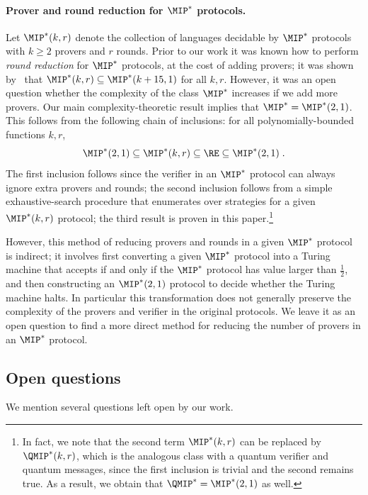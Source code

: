 \documentclass[11pt]{article}
\theoremstyle{definition}
\begin{document}
\paragraph{Prover and round reduction for $\MIP^*$ protocols.} Let $\MIP^*(k,r)$ denote the collection of languages decidable by $\MIP^*$ protocols with $k\geq 2$ provers and $r$ rounds. Prior to our work it was known how to perform \emph{round reduction} for $\MIP^*$ protocols, at the cost of adding provers; it was shown by~\cite{ji2017compression,fitzsimons2018quantum} that $\MIP^*(k,r) \subseteq \MIP^*(k + 15,1)$ for all $k, r$. However, it was an open question whether the complexity of the class $\MIP^*$ increases if we add more provers.
Our main complexity-theoretic result implies that $\MIP^* = \MIP^*(2,1)$. This follows from the following chain of inclusions: for all polynomially-bounded functions $k,r$,
 \[
 	\MIP^*(2,1) \subseteq \MIP^*(k,r) \subseteq \RE \subseteq \MIP^*(2,1)\;.
\]
The first inclusion follows since the verifier in an $\MIP^*$ protocol can always ignore extra provers and rounds; the second inclusion follows from a simple exhaustive-search procedure that enumerates over strategies for a given $\MIP^*(k,r)$ protocol; the third result is proven in this paper.\footnote{In fact, we note that the second term $\MIP^*(k,r)$ can be replaced by $\QMIP^*(k,r)$, which is the analogous class with a quantum verifier and quantum messages, since the first inclusion is trivial and the second remains true. As a result, we obtain that $\QMIP^* = \MIP^*(2,1)$ as well.}

However, this method of reducing provers and rounds in a given $\MIP^*$ protocol is indirect; it involves first converting a given $\MIP^*$ protocol into a Turing machine that accepts if and only if the $\MIP^*$ protocol has value larger than $\frac{1}{2}$, and then constructing an $\MIP^*(2,1)$ protocol to decide whether the Turing machine halts. In particular this transformation does not generally preserve the complexity of the provers and verifier in the original protocols. We leave it as an open question to find a more direct method for reducing the number of provers in an $\MIP^*$ protocol.



\subsection{Open questions}
\label{sec:open}

We mention several questions left open by our work.
\end{document}
